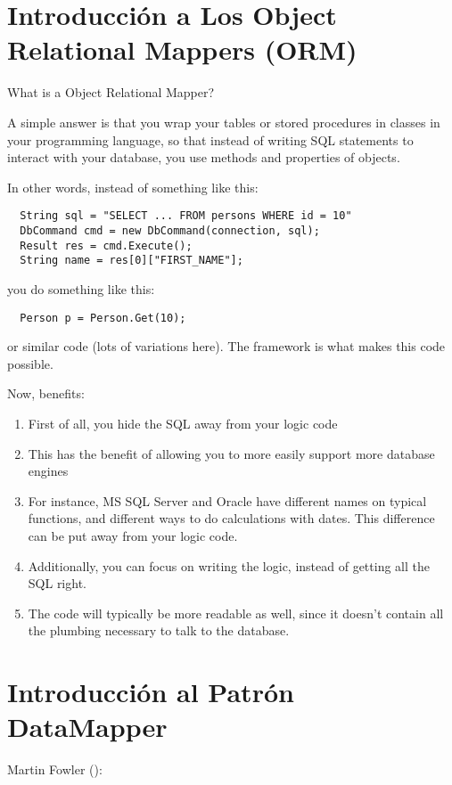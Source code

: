 
\section{Introducción a Los Object Relational Mappers (ORM)}

What is a Object Relational Mapper?

A simple answer is that you wrap your tables or stored procedures
in classes in your programming language, so that instead of writing
SQL statements to interact with your database, you use methods and
properties of objects.

In other words, instead of something like this:

\begin{verbatim}
  String sql = "SELECT ... FROM persons WHERE id = 10"
  DbCommand cmd = new DbCommand(connection, sql);
  Result res = cmd.Execute();
  String name = res[0]["FIRST_NAME"];
\end{verbatim}
you do something like this:

\begin{verbatim}
  Person p = Person.Get(10);
\end{verbatim}

or similar code (lots of variations here). 
The framework is what makes this code possible.

Now, benefits:

\begin{enumerate}
\item 
First of all, you hide the SQL away from your logic
code
\item 
This has the benefit of allowing you to more easily support
more database engines 
\item 
For instance, MS SQL Server and Oracle have
different names on typical functions, and different ways to do
calculations with dates.
This difference can be put away from your
logic code.
\item 
Additionally, you can focus on writing the logic, instead of getting all the SQL right.
\item 
The code will typically be more readable as well, since it doesn't
contain all the plumbing necessary to talk to the database.
\end{enumerate}

\section{Introducción al Patrón DataMapper}
Martin Fowler 
():

